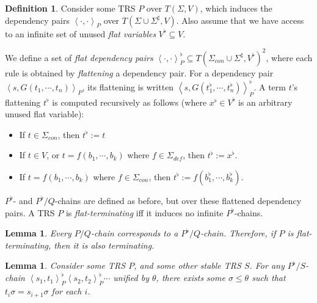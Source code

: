 \documentclass{article}
\newtheorem{lemma}[theorem]{Lemma}
\theoremstyle{definition}
\newtheorem{definition}[theorem]{Definition}
\newcommand{\dpair}[2]{\left\langle #1, #2 \right\rangle}
\begin{document}
\begin{definition}
    Consider some TRS $P$ over $T(\Sigma, V)$, which induces the dependency pairs $\dpair{\cdot}{\cdot}_P$ over $T(\Sigma \cup \Sigma^\sharp, V)$. Also assume that we have access to an infinite set of unused \emph{flat variables} $V^\flat \subseteq V$.
    
    We define a set of \emph{flat dependency pairs} $\dpair{\cdot}{\cdot}^\flat_P \subseteq T(\Sigma_{con} \cup \Sigma^\sharp, V^\flat)^2$, where each rule is obtained by \emph{flattening} a dependency pair. For a dependency pair $\dpair{s}{G(t_1 , \cdots, t_n)}_P$, its flattening is written $\dpair{s}{G( t^\flat_1, \cdots, t_n^\flat)}^\flat_P$. A term $t$'s flattening $t^\flat$ is computed recursively as follows (where $x^\flat \in V^\flat$ is an arbitrary unused flat variable):
    \begin{itemize}
        \item If $t \in \Sigma_{con}$, then $t^\flat := t$
        \item If $t \in V$, or $t = f (b_1, \cdots, b_k)$ where $f \in \Sigma_{def}$, then $t^\flat := x^\flat$.
        \item If $t = f( b_1, \cdots, b_k)$ where $f \in \Sigma_{con}$, then $t^\flat := f( b^\flat_1, \cdots, b^\flat_k)$.
    \end{itemize} 
    $P^\flat$- and $P^\flat/Q$-chains are defined as before, but over these flattened dependency pairs. A TRS $P$ is \emph{flat-terminating} iff it induces no infinite $P^\flat$-chains. 
\end{definition}

\begin{lemma} \label{thm:flat_termination_overapprox}
    Every $P/Q$-chain corresponds to a $P^\flat/Q$-chain. Therefore, if $P$ is flat-terminating, then it is also terminating.
\end{lemma}

\begin{lemma} 
    Consider some TRS $P$, and some other stable TRS $S$. For any $P^\flat/S$-chain $\dpair{s_1}{t_1}^\flat_P \dpair{s_2}{t_2}^\flat_P \cdots$ unified by $\theta$, there exists some $\sigma \leq \theta$ such that $t_i \sigma = s_{i+1} \sigma$ for each $i$. 
\end{lemma}
\end{document}
